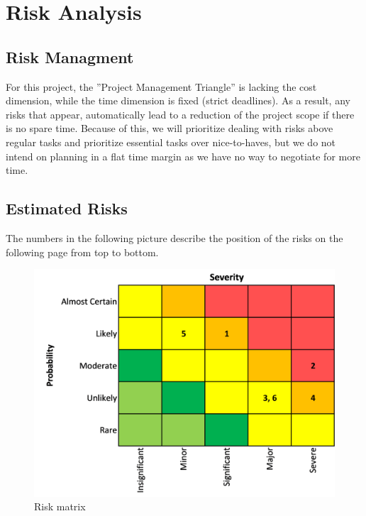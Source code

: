 \section{Risk Analysis}
\subsection{Risk Managment}
For this project, the ”Project Management Triangle” is lacking the cost dimension, while the time dimension is fixed (strict deadlines). As a result, any risks that appear, automatically lead to a reduction of the project scope if there is no spare time. Because of this, we will prioritize dealing with risks above regular tasks and prioritize essential tasks over nice-to-haves, but we do not intend on planning in a flat time margin as we have no way to negotiate for more time.

\subsection{Estimated Risks}
The numbers in the following picture describe the position of the risks on the following page from top to bottom.

\begin{figure}[H]
  \includegraphics[width=\linewidth]{resources/risks-matrix.png}
  \caption{Risk matrix}
  \label{risk_matrix}
\end{figure}

